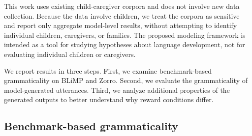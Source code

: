 This work uses existing child-caregiver corpora and does not involve new data collection. Because the data involve children, we treat the corpora as sensitive and report only aggregate model-level results, without attempting to identify individual children, caregivers, or families. The proposed modeling framework is intended as a tool for studying hypotheses about language development, not for evaluating individual children or caregivers.





\iffalse
We report results in three steps. First, we examine benchmark-based grammaticality on BLiMP and Zorro. Second, we evaluate the grammaticality of model-generated utterances. Third, we analyze additional properties of the generated outputs to better understand why reward conditions differ.


\subsection{Benchmark-based grammaticality}
\label{sec:results_benchmark}


